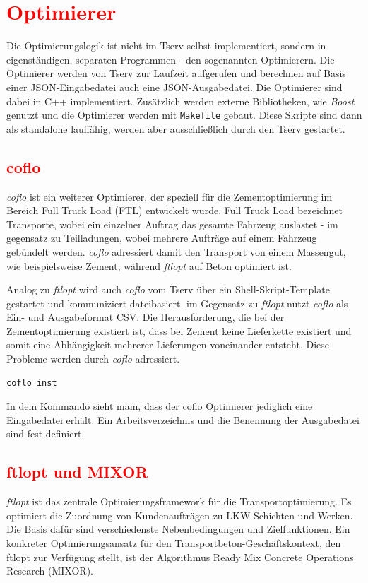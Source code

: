 \section{\textcolor{red}{Optimierer}}
Die Optimierungslogik ist nicht im Tserv selbst implementiert, sondern in eigenständigen, separaten Programmen - den sogenannten Optimierern. Die Optimierer werden von Tserv zur Laufzeit aufgerufen und berechnen auf Basis einer JSON-Eingabedatei auch eine JSON-Ausgabedatei. Die Optimierer sind dabei in C++ implementiert. Zusätzlich werden externe Bibliotheken, wie \textit{Boost} genutzt und die Optimierer werden mit \texttt{Makefile} gebaut. Diese Skripte sind dann als standalone lauffähig, werden aber ausschließlich durch den Tserv gestartet.

\subsection{\textcolor{red}{coflo}}
\textit{coflo} ist ein weiterer Optimierer, der speziell für die Zementoptimierung im Bereich Full Truck Load (FTL) entwickelt wurde. Full Truck Load bezeichnet Transporte, wobei ein einzelner Auftrag das gesamte Fahrzeug auslastet - im gegensatz zu Teilladungen, wobei mehrere Aufträge auf einem Fahrzeug gebündelt werden. \textit{coflo} adressiert damit den Transport von einem Massengut, wie beispielsweise Zement, während \textit{ftlopt} auf Beton optimiert ist.

Analog zu \textit{ftlopt} wird auch \textit{coflo} vom Tserv über ein Shell-Skript-Template gestartet und kommuniziert dateibasiert. im Gegensatz zu \textit{ftlopt} nutzt \textit{coflo} als Ein- und Ausgabeformat CSV. Die Herausforderung, die bei der Zementoptimierung existiert ist, dass bei Zement keine Lieferkette existiert und somit eine Abhängigkeit mehrerer Lieferungen voneinander entsteht. Diese Probleme werden durch  \textit{coflo} adressiert.

\begin{verbatim}
coflo inst
\end{verbatim}

In dem Kommando sieht mam, dass der coflo Optimierer jediglich eine Eingabedatei erhält. Ein Arbeitsverzeichnis und die Benennung der Ausgabedatei sind fest definiert.

\subsection{\textcolor{red}{ftlopt und MIXOR}}
\textit{ftlopt} ist das zentrale Optimierungsframework für die Transportoptimierung. Es optimiert die Zuordnung von Kundenaufträgen zu LKW-Schichten und Werken. Die Basis dafür sind verschiedenste Nebenbedingungen und Zielfunktionen. Ein konkreter Optimierungsansatz für den Transportbeton-Geschäftskontext, den ftlopt zur Verfügung stellt, ist der Algorithmus Ready Mix Concrete Operations Research (MIXOR).

